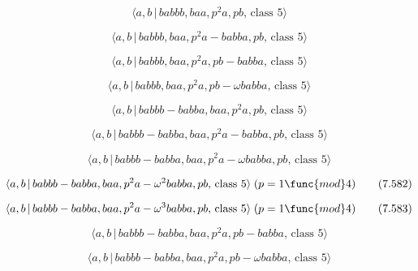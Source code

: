 \documentclass[10pt]{article}
\begin{document}
\begin{equation}
\langle a,b\,|\,babbb,baa,p^2a,pb,\,\text{class }5\rangle  \tag{7.575}
\end{equation}

\begin{equation}
\langle a,b\,|\,babbb,baa,p^2a-babba,pb,\,\text{class }5\rangle  \tag{7.576}
\end{equation}

\begin{equation}
\langle a,b\,|\,babbb,baa,p^2a,pb-babba,\,\text{class }5\rangle  \tag{7.577}
\end{equation}

\begin{equation}
\langle a,b\,|\,babbb,baa,p^{2}a,pb-\omega babba,\,\text{class }5\rangle 
\tag{7.578}
\end{equation}

\begin{equation}
\langle a,b\,|\,babbb-babba,baa,p^2a,pb,\,\text{class }5\rangle  \tag{7.579}
\end{equation}

\begin{equation}
\langle a,b\,|\,babbb-babba,baa,p^2a-babba,pb,\,\text{class }5\rangle 
\tag{7.580}
\end{equation}

\begin{equation}
\langle a,b\,|\,babbb-babba,baa,p^{2}a-\omega babba,pb,\,\text{class }%
5\rangle  \tag{7.581}
\end{equation}

\begin{equation}
\langle a,b\,|\,babbb-babba,baa,p^{2}a-\omega ^{2}babba,pb,\,\text{class }%
5\rangle \;(p=1\func{mod}4)  \tag{7.582}
\end{equation}

\begin{equation}
\langle a,b\,|\,babbb-babba,baa,p^{2}a-\omega ^{3}babba,pb,\,\text{class }%
5\rangle \;(p=1\func{mod}4)  \tag{7.583}
\end{equation}

\begin{equation}
\langle a,b\,|\,babbb-babba,baa,p^2a,pb-babba,\,\text{class }5\rangle 
\tag{7.584}
\end{equation}

\begin{equation}
\langle a,b\,|\,babbb-babba,baa,p^{2}a,pb-\omega babba,\,\text{class }%
5\rangle  \tag{7.585}
\end{equation}
\end{document}
